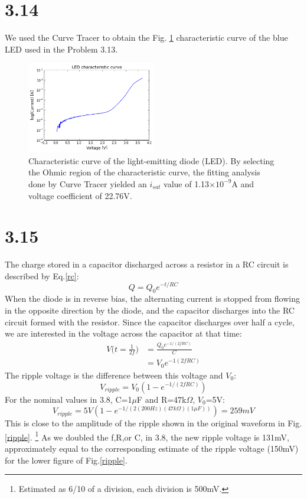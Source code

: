 \documentclass[authoryear, 12pt,5p, times]{elsarticle}
\begin{document}
\section*{3.14}
We used the Curve Tracer to obtain the Fig. \ref{3_14_LED} characteristic curve of the blue LED used in the Problem 3.13. 
\begin{figure}[h!]
\center
\includegraphics[width=0.5\textwidth]{figure/3_14_LED}
\caption{Characteristic curve of the light-emitting diode (LED). By selecting the Ohmic region of the characteristic curve, the fitting analysis done by Curve Tracer yielded an $i_{sat}$ value of 1.13$\times10^{-9}$A and voltage coefficient of 22.76V.}
\label{3_14_LED}
\end{figure}
\section*{3.15}
The charge stored in a capacitor discharged across a resistor in a RC circuit is described by Eq.\ref{rc}: 
\begin{equation}
Q = Q_0 e^{-t/RC}
\label{rc}
\end{equation}
When the diode is in reverse bias, the alternating current is stopped from flowing in the opposite direction by the diode, and the capacitor discharges into the RC circuit formed with the resistor. Since the capacitor discharges over half a cycle, we are interested in the voltage across the capacitor at that time:
\begin{equation}
\begin{split}
V\Big(t=\frac{1}{2f}\Big) &= \frac{Q_0e^{-1/(2fRC)}}{C}  \\&= V_0 e^{-1(2fRC)}
\end{split}
\end{equation} The ripple voltage is the difference between this voltage and $V_0$: 
\begin{equation}
V_{ripple} = V_0(1-e^{-1/(2fRC)})
\end{equation}
For the nominal values in 3.8, C=1$\mu$F and R=47k$\Omega$, $V_0$=5V:
$$V_{ripple} = 5V(1-e^{-1/(2(200Hz)(47k\Omega)(1\mu F))})=259mV$$
This is close to the amplitude of the ripple shown in the original waveform in Fig.\ref{ripple}. \footnote{Estimated as 6/10 of a division, each division is 500mV.}
As we doubled the f,R,or C, in 3.8, the new ripple voltage is 131mV, approximately equal to the corresponding estimate of the ripple voltage (150mV) for the lower figure of Fig.\ref{ripple}.
\end{document}
